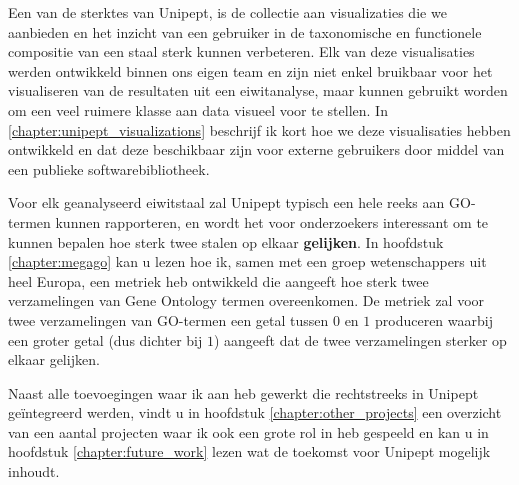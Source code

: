 Een van de sterktes van Unipept, is de collectie aan visualizaties die we aanbieden en het inzicht van een gebruiker in de taxonomische en functionele compositie van een staal sterk kunnen verbeteren.
Elk van deze visualisaties werden ontwikkeld binnen ons eigen team en zijn niet enkel bruikbaar voor het visualiseren van de resultaten uit een eiwitanalyse, maar kunnen gebruikt worden om een veel ruimere klasse aan data visueel voor te stellen.
In \ref{chapter:unipept_visualizations} beschrijf ik kort hoe we deze visualisaties hebben ontwikkeld en dat deze beschikbaar zijn voor externe gebruikers door middel van een publieke softwarebibliotheek.

Voor elk geanalyseerd eiwitstaal zal Unipept typisch een hele reeks aan GO-termen kunnen rapporteren, en wordt het voor onderzoekers interessant om te kunnen bepalen hoe sterk twee stalen op elkaar \textbf{gelijken}.
In hoofdstuk \ref{chapter:megago} kan u lezen hoe ik, samen met een groep wetenschappers uit heel Europa, een metriek heb ontwikkeld die aangeeft hoe sterk twee verzamelingen van Gene Ontology termen overeenkomen.
De metriek zal voor twee verzamelingen van GO-termen een getal tussen $0$ en $1$ produceren waarbij een groter getal (dus dichter bij $1$) aangeeft dat de twee verzamelingen sterker op elkaar gelijken.

Naast alle toevoegingen waar ik aan heb gewerkt die rechtstreeks in Unipept geïntegreerd werden, vindt u in hoofdstuk \ref{chapter:other_projects} een overzicht van een aantal projecten waar ik ook een grote rol in heb gespeeld en kan u in hoofdstuk \ref{chapter:future_work} lezen wat de toekomst voor Unipept mogelijk inhoudt.
